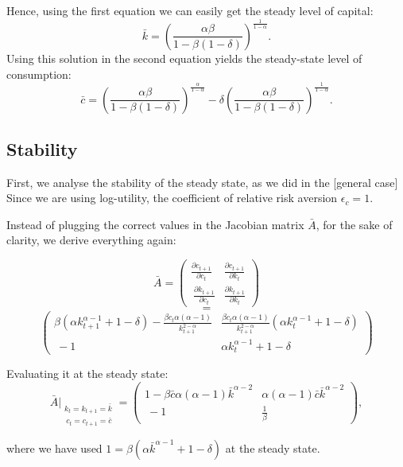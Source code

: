 \documentclass[11pt,a4paper,english]{article}
\begin{document}
Hence, using the first equation we can easily get the steady level of
capital:
\[ \bar{k} = \left(\frac{\alpha \beta}{1-\beta(1-\delta)}\right)^{\frac{1}{1-\alpha}}.\]
Using this solution in the second equation yields the steady-state level
of consumption:
\[ \bar{c} = \left(\frac{\alpha \beta}{1-\beta (1-\delta)}\right)^{\frac{\alpha}{1-\alpha}} - \delta \left(\frac{\alpha \beta}{1-\beta (1- \delta)}\right)^{\frac{1}{1-\alpha}}.\]

\hypertarget{stability-1}{%
\subsection{Stability}\label{stability-1}}

First, we analyse the stability of the steady state, as we did in the
{[}general case{]} Since we are using log-utility, the coefficient of
relative risk aversion \(\epsilon_{c} = 1.\)

Instead of plugging the correct values in the Jacobian matrix
\(\bar{A}\), for the sake of clarity, we derive everything again:

\[\bar{A} = \begin{pmatrix}
\frac{\partial c_{t+1}}{\partial c_{t}} & \frac{\partial c_{t+1}}{\partial k_{t}} \\\
\frac{\partial k_{t+1}}{\partial c_{t}} & \frac{\partial k_{t+1}}{\partial k_{t}}
\end{pmatrix}
\] \[ = \] \[\begin{pmatrix}
\beta \left( \alpha k_{t+1}^{\alpha -1} + 1 - \delta \right) - \frac{\beta c_{t} \alpha (\alpha-1) }{k_{t+1}^{2-\alpha}} & \frac{\beta c_{t} \alpha (\alpha -1)}{k_{t+1}^{2-\alpha}} \left( \alpha k_{t}^{\alpha-1} + 1 - \delta \right) \\\
-1 & \alpha k_{t}^{\alpha -1} + 1 - \delta \end{pmatrix}\]

Evaluating it at the steady state: \[\bar{A}\bigr\rvert_{\substack{
    k_{t} = k_{t+1} = \bar{k} \\\
     c_{t} = c_{t+1} = \bar{c}
}
}
   = \begin{pmatrix}
    1 - \beta \bar{c}  \alpha (\alpha -1) \bar{k}^{\alpha -2}  & \alpha (\alpha -1 ) \bar{c}  \bar{k}^{\alpha -2} \\\
    -1  & \frac{1}{\beta}
\end{pmatrix},\]

where we have used
\(1 = \beta \left( \alpha \bar{k}^{\alpha -1} + 1 - \delta \right)\) at
the steady state.
\end{document}
